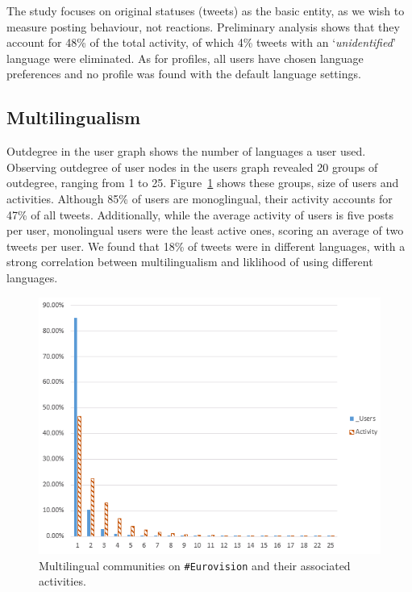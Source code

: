 \documentclass{llncs}
\begin{document}

The study focuses on original statuses (tweets) as the basic entity,
as we wish to measure posting behaviour, not reactions. Preliminary
analysis shows that they account for 48\% of the total activity, of
which 4\% tweets with an `{\emph{unidentified}}' language were
eliminated. As for profiles, all users have chosen language
preferences and no profile was found with the default language
settings.


\subsection{Multilingualism}

Outdegree in the user graph shows the number of languages a user used.
Observing outdegree of user nodes in the users graph revealed 20
groups of outdegree, ranging from 1 to
25. Figure~\ref{fig:multilingual} shows these groups, size of users
and activities. Although 85\% of users are monoglingual, their
activity accounts for 47\% of all tweets. Additionally, while the
average activity of users is five posts per user, monolingual users
were the least active ones, scoring an average of two tweets per
user. We found that 18\% of tweets were in different languages, with a
strong correlation between multilingualism and liklihood of using
different languages.

\begin{figure}[htb]
\centering
\includegraphics[width=0.8\columnwidth]{images/multilingualcommunities.png}
\caption{Multilingual communities on {\texttt{\#Eurovision}} and their associated activities.}
\label{fig:multilingual}
\end{figure}
\end{document}
